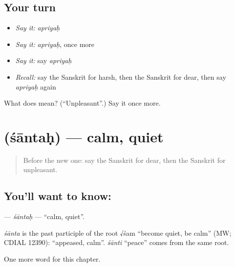 \subsection*{Your turn}
\begin{itemize}
\raggedright
  \item \emph{Say it:} \emph{apriyaḥ}
  \item \emph{Say it:} \emph{apriyaḥ}, once more
  \item \emph{Say it:} say \emph{apriyaḥ}
  \item \emph{Recall:} say the Sanskrit for harsh, then the Sanskrit for dear, then say \emph{apriyaḥ} again
\end{itemize}

\begin{tcolorbox}[breakable,colback=teal!4,colframe=teal!35!black,title={Before you move on}]
What does  mean? (\textquotedblleft{}Unpleasant\textquotedblright{}.) Say it once more.
\end{tcolorbox}
\section[\texorpdfstring{\sk{शान्तः} (śāntaḥ)}{शान्तः (śāntaḥ)}]{ (śāntaḥ) — calm, quiet}

\label{lesson:SA-C156-santah}



\begin{quote}
Before the new one: say the Sanskrit for dear, then the Sanskrit for unpleasant.
\end{quote}

\subsection*{You'll want to know: }
\textbf{} — \emph{śāntaḥ} — \textquotedblleft{}calm, quiet\textquotedblright{}.

\begin{cousinweb}
\emph{śānta} is the past participle of the root √śam \textquotedblleft{}become quiet, be calm\textquotedblright{} (MW; CDIAL 12390): \textquotedblleft{}appeased, calm\textquotedblright{}. \emph{śānti} \textquotedblleft{}peace\textquotedblright{} comes from the same root.
\end{cousinweb}

\begin{grammarlens}[title={What you've built}]
One more word for this chapter.
\end{grammarlens}

